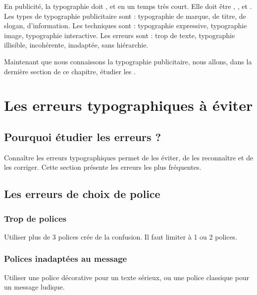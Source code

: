 \begin{retenir}
En publicité, la typographie doit ,  et  en un temps très court. Elle doit être , ,  et . Les types de typographie publicitaire sont : typographie de marque, de titre, de slogan, d'information. Les techniques sont : typographie expressive, typographie image, typographie interactive. Les erreurs sont : trop de texte, typographie illisible, incohérente, inadaptée, sans hiérarchie.
\end{retenir}

Maintenant que nous connaissons la typographie publicitaire, nous allons, dans la dernière section de ce chapitre, étudier les .

\section{Les erreurs typographiques à éviter}

\subsection{Pourquoi étudier les erreurs ?}

Connaître les erreurs typographiques permet de les éviter, de les reconnaître et de les corriger. Cette section présente les erreurs les plus fréquentes.

\subsection{Les erreurs de choix de police}

\subsubsection{Trop de polices}

Utiliser plus de 3 polices crée de la confusion. Il faut limiter à 1 ou 2 polices.

\subsubsection{Polices inadaptées au message}

Utiliser une police décorative pour un texte sérieux, ou une police classique pour un message ludique.

